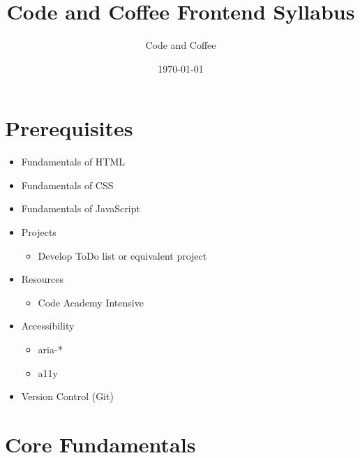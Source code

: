 \documentclass[12pt]{article}
\title{Code and Coffee Frontend Syllabus}
\author{Code and Coffee}
\date{\today}
\begin{document}
\maketitle

\section{Prerequisites}

\begin{itemize}
\item Fundamentals of HTML
\item Fundamentals of CSS
\item Fundamentals of JavaScript
\item Projects
  \begin{itemize}
  \item Develop ToDo list or equivalent project
  \end{itemize}
\item Resources
  \begin{itemize}
  \item Code Academy Intensive
  \end{itemize}
\item Accessibility
  \begin{itemize}
  \item aria-*
  \item a11y
  \end{itemize}
\item Version Control (Git)
\end{itemize}

\section{Core Fundamentals}
\end{document}
